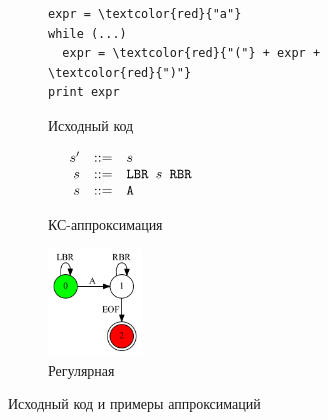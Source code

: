 \begin{figure}[!h]
	\centering
	\begin{subfigure}[h!]{0.33\textwidth}
		\centering
		\begin{minipage}{5cm}
			\begin{Verbatim}[commandchars=\\\{\}]
expr = \textcolor{red}{"a"}
while (...)
  expr = \textcolor{red}{"("} + expr + \textcolor{red}{")"}
print expr
			\end{Verbatim}
		\end{minipage}
		\caption{Исходный код}
		\label{fig:code}
	\end{subfigure}
	\hfill
	\begin{subfigure}[h!]{0.3\textwidth}
		\centering
		$
		\begin{array}{crcl}
			&s' &::=& s \\
			&s & ::= & \mbox{\texttt{LBR }} s \mbox{\texttt{ RBR}}\\
			&s & ::= & \mbox{\texttt{A}}
		\end{array}
		$
		\caption{КС-аппроксимация}
		\label{fig:app_cf}
	\end{subfigure}
	\hfill
	\begin{subfigure}[h!]{0.3\textwidth}
		\centering
		\includegraphics[width=2.5cm]{pictures/kovalev-spbu-reg_app}
		\caption{Регулярная}
		\label{fig:app_r}
	\end{subfigure}
	\caption{Исходный код и примеры аппроксимаций}
	\label{example}
\end{figure}